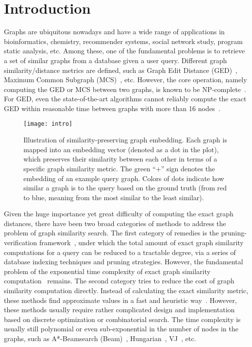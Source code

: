 \documentclass[sigconf]{acmart}
\begin{document}
\section{Introduction}
\label{sec-intro}

Graphs are ubiquitous nowadays and have a wide range of applications in bioinformatics, chemistry, recommender systems, social network study, program static analysis, etc. Among these, one of the fundamental problems is to retrieve a set of similar graphs from a database given a user query. Different graph similarity/distance metrics are defined, such as Graph Edit Distance (GED)~\cite{bunke1983distance}, Maximum Common Subgraph (MCS)~\cite{bunke1998graph}, etc. However, the core operation, namely computing the GED or MCS between two graphs, is known to be NP-complete~\cite{zeng2009comparing,bunke1998graph}. For GED, even the state-of-the-art algorithms cannot reliably compute the exact GED within reasonable time between graphs with more than 16 nodes~\cite{blumenthal2018exact}.

\begin{figure}
\centering
\texttt{[image: intro]}
\vspace{-0.1in}
\caption{Illustration of similarity-preserving graph embedding. Each graph is mapped into an embedding vector (denoted as a dot in the plot), which preserves their similarity between each other in terms of a specific graph similarity metric. The green ``+'' sign denotes the embedding of an example query graph. Colors of dots indicate how similar a graph is to the query based on the ground truth (from red to blue, meaning from the most similar to the least similar).}
\label{fig:intro}
\vspace*{-5mm}
\end{figure}

Given the huge importance yet great difficulty of computing the exact graph distances, there have been two broad categories of methods to address the problem of graph similarity search. The first category of remedies is the pruning-verification framework~\cite{zeng2009comparing,zhao2013partition,liang2017similarity}, under which the total amount of exact graph similarity computations for a query can be reduced to a tractable degree, via a series of database indexing techniques and pruning strategies. However, the fundamental problem of the exponential time complexity of exact graph similarity computation~\cite{neuhaus2006fast} remains. The second category tries to reduce the cost of graph similarity computation directly. Instead of calculating the exact similarity metric, these methods find approximate values in a fast and heuristic way~\cite{neuhaus2006fast,riesen2009approximate,fankhauser2011speeding,bougleux2017graph,daller2018approximate}. However, these methods usually require rather complicated design and implementation based on discrete optimization or combinatorial search. The time complexity is usually still polynomial or even sub-exponential in the number of nodes in the graphs, such as A*-Beamsearch (Beam)~\cite{neuhaus2006fast}, Hungarian~\cite{riesen2009approximate}, VJ~\cite{fankhauser2011speeding}, etc. 
\end{document}

